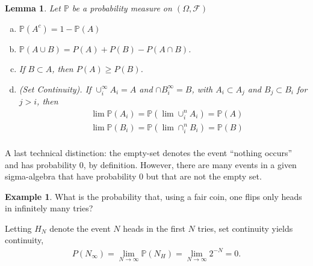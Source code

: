 \documentclass[12pt]{article}
\newcommand{\filter}{\mathcal{F}}
\newcommand{\prob}{\mathbb{P}}
\theoremstyle{plain}
\newtheorem{lemma}[theorem]{Lemma}
\theoremstyle{definition}
\newtheorem*{example}{Example}
\theoremstyle{remark}
\numberwithin{equation}{section}  %
\begin{document}
\begin{lemma}
    Let $\prob$ be a probability measure on $(\Omega, \filter)$
    \begin{enumerate}[(a)]
        \item $\prob(A^c) = 1 - \prob(A)$
        \item $\prob(A \cup B) = P(A) + P(B) - P(A \cap B)$.
        \item If $B \subset A$, then $P(A) \ge P(B)$.
        \item \emph{(Set Continuity)}.
            If $\cup_i^\infty A_i = A$ and
            $\cap B_i^\infty = B$, with $A_i \subset A_j$ and $B_j \subset B_i$ for $j > i$,
            then
            \begin{align*}
                & \lim \prob(A_i) = \prob(\lim \cup_i^n A_i) = \prob(A) \\
                & \lim \prob(B_i) = \prob(\lim \cap_i^n B_i) = \prob(B) \\
            \end{align*}
    \end{enumerate}
\end{lemma}
A last technical distinction: the empty-set denotes the event ``nothing
occurs'' and has probability $0$, by definition. However, there are many
events in a given sigma-algebra that have probability $0$ but that are not the
empty set.

\begin{example}What is the probability that, using a fair coin, one
    flips only heads in infinitely many tries? 
\end{example}
Letting $H_N$ denote the event
$N$ heads in the first $N$ tries, set continuity yields
continuity,
\begin{align*}
    P(N_\infty) = \lim_{N \to \infty} \prob(N_H) = \lim_{N \to \infty} 2^{-N} = 0.
\end{align*}
\end{document}
